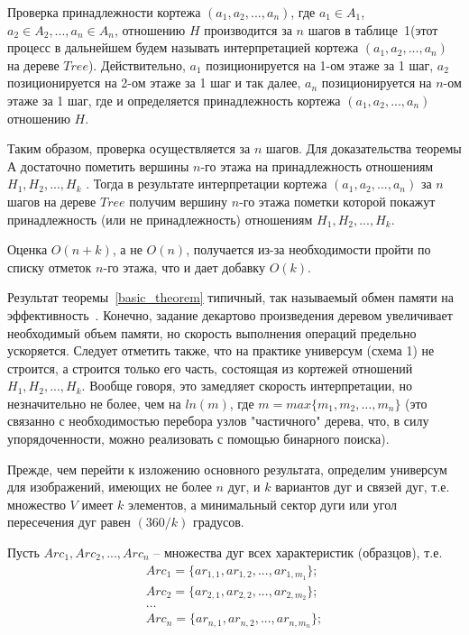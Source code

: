Проверка принадлежности кортежа $(a_1,a_2, ..., a_n)$, где $a_1 \in A_1$, $a_2 \in A_2, ..., a_n \in A_n$, отношению $H$ производится за $n$ шагов в таблице~1(этот процесс в дальнейшем будем называть интерпретацией кортежа $(a_1,a_2, ..., a_n)$ на дереве $Tree$). Действительно, $a_1$ позиционируется на 1-ом этаже за 1 шаг, $a_2$ позиционируется на 2-ом этаже за 1 шаг и так далее, $a_n$ позиционируется на $n$-ом этаже за 1 шаг, где и определяется принадлежность кортежа $(a_1,a_2, ..., a_n)$ отношению $H$.

Таким образом, проверка осуществляется за $n$ шагов. Для доказательства теоремы $А$ достаточно пометить вершины $n$-го этажа на принадлежность отношениям $H_1, H_2, ..., H_k$ . Тогда в результате интерпретации кортежа $(a_1,a_2, ..., a_n)$ за $n$ шагов на дереве $Tree$ получим вершину $n$-го этажа пометки которой покажут принадлежность (или не принадлежность) отношениям $H_1, H_2, ..., H_k$.

Оценка $O(n+k)$, а не $O(n)$, получается из-за необходимости пройти по списку отметок $n$-го этажа, что и дает добавку $O(k)$.

\begin{remark}
Результат теоремы~\ref{basic_theorem} типичный, так называемый обмен памяти на эффективность~\cite{D11}.
Конечно, задание декартово произведения деревом увеличивает необходимый объем памяти, но скорость выполнения операций предельно ускоряется. Следует отметить также, что на практике универсум (схема 1) не строится, а строится только его часть, состоящая из кортежей отношений $H_1, H_2, ..., H_k$. Вообще говоря, это замедляет скорость интерпретации, но незначительно не более, чем на $ln(m)$, где $m = max\{ m_1, m_2, …, m_n\}$ 
(это связанно с необходимостью перебора узлов "частичного" дерева, что, в силу упорядоченности, можно реализовать с помощью бинарного поиска).
\end{remark}

Прежде, чем перейти к изложению основного результата, определим универсум для изображений, имеющих не более $n$ дуг, и $k$ вариантов дуг и связей дуг, т.е. множество $V$ имеет $k$ элементов, а минимальный сектор дуги или угол пересечения дуг равен $(360/k)$ градусов.

Пусть $Arc_1, Arc_2, ..., Arc_n$ – множества дуг всех характеристик (образцов), т.е.
\begin{equation}
\begin{array}{c}
Arc_1 = \{ar_{1,1}, ar_{1,2}, ..., ar_{1,m_1}\}; \\
Arc_2 = \{ ar_{2,1}, ar_{2,2}, ..., ar_{2,m_2}\}; \\
\dots \\
Arc_n = \{ ar_{n,1}, ar_{n,2}, ..., ar_{n,m_n}\}; \\
\end{array}
\end{equation}


